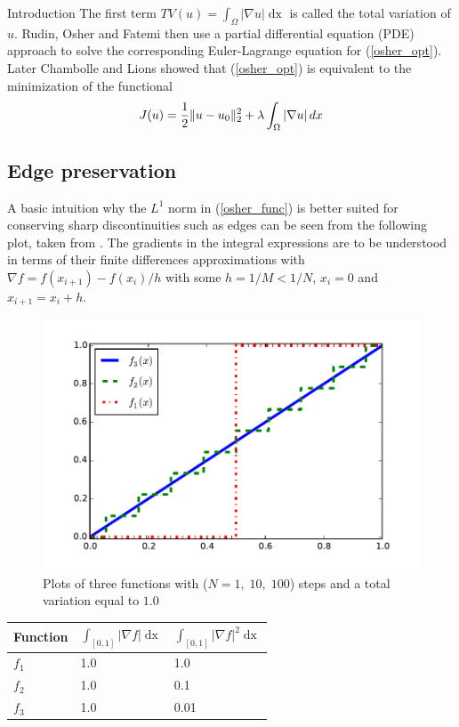 \begin{chapter}{Introduction}
The first term $TV(u)=\int_\Omega\left\vert\nabla u\right\vert\mathop{dx}$ is called the total variation of $u$. Rudin, Osher and Fatemi then use a partial differential equation (PDE) approach to solve
the corresponding Euler-Lagrange equation for (\ref{osher_opt}). Later Chambolle and Lions \cite{ChambolleLions} showed that (\ref{osher_opt}) is equivalent to the minimization of
the functional
\begin{equation}
    \label{osher_func}
    J(u)=\frac{1}{2}\| u-u_0 \|_2^2 +\lambda \int_\Omega\left\vert\nabla u\right\vert\mathop{dx}
\end{equation}

\subsection{Edge preservation} %
\label{sub:Edge preservation}
A basic intuition why the $L^1$ norm in (\ref{osher_func}) is better suited for conserving sharp discontinuities such as edges can be seen from the following plot, taken from \cite{SceneFlow}. The gradients in the integral expressions are to be understood in terms of their finite differences approximations with $\nabla f=f(x_{i+1})-f(x_i)/h$ with some $h=1/M<1/N$, $x_i=0$ and $x_{i+1}=x_i+h$.\\
 
\begin{figure}[h!]
        \centering
	    \includegraphics[width=0.9\linewidth]{./figures/introduction/tv12comparison.pdf}
	\caption[Comparison total variation]{Plots of three functions with ($N=1,\;10,\;100$) steps and a total variation equal to $1.0$}
	\label{fig:tv12comparison}
\end{figure}
\begin{table}[h!]
\centering
\begin{tabular}{|l|l|l|}
    \hline
    \textbf{Function} & $\int_{[0,1]}\left\vert\nabla f\right\vert\mathop{dx}$ & $\int_{[0,1]}\left\vert\nabla f\right\vert^2\mathop{dx}$ \\
    \hline
    $f_1$ & 1.0 & 1.0 \\
    $f_2$ & 1.0 & 0.1 \\
    $f_3$ & 1.0 & 0.01 \\
    \hline
\end{tabular}
\end{table}


\end{chapter}
